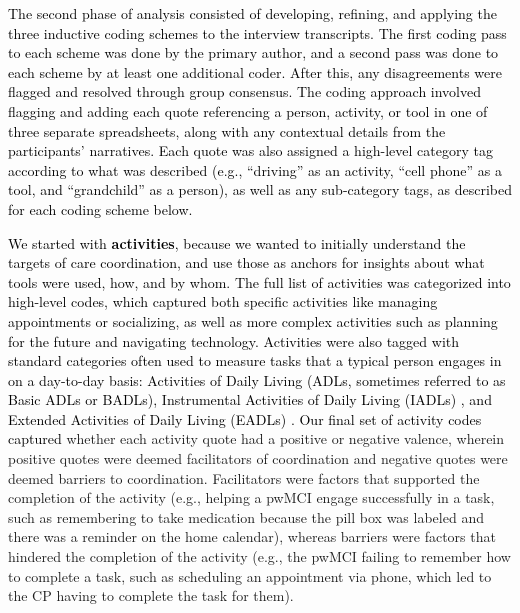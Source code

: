 \documentclass[acmsmall]{acmart}
\begin{document}
\textcolor{black}{The second phase of analysis consisted of developing, refining, and applying the three inductive coding schemes to the interview transcripts. The first coding pass to each scheme was done by the primary author, and a second pass was done to each scheme by at least one additional coder. After this, any disagreements were flagged and resolved through group consensus. The coding approach involved flagging and adding each quote referencing a person, activity, or tool in one of three separate spreadsheets, along with any contextual details from the participants’ narratives. Each quote was also assigned a high-level category tag according to what was described (e.g., “driving” as an activity, “cell phone” as a tool, and “grandchild” as a person), as well as any sub-category tags, as described for each coding scheme below.}

\textcolor{black}{We started with \textbf{activities}, because we wanted to initially understand the targets of care coordination, and use those as anchors for insights about what tools were used, how, and by whom. The full list of activities was categorized into high-level codes, which captured both specific activities like managing appointments or socializing, as well as more complex activities such as planning for the future and navigating technology. Activities were also tagged with  standard categories often used to measure tasks that a typical person engages in on a day-to-day basis: Activities of Daily Living (ADLs, sometimes referred to as Basic ADLs or BADLs), Instrumental Activities of Daily Living (IADLs) \cite{pashmdarfard2020assessment}, and Extended Activities of Daily Living (EADLs) \cite{kim2025evaluation}.  Our final set of activity codes captured} whether each activity quote had a positive or negative valence, wherein positive quotes were deemed facilitators of coordination and negative quotes were deemed barriers to coordination. Facilitators were factors that supported the completion of the activity (e.g., helping a pwMCI engage successfully in a task, such as remembering to take medication because the pill box was labeled and there was a reminder on the home calendar), whereas barriers were factors that hindered the completion of the activity (e.g., the pwMCI failing to remember how to complete a task, such as scheduling an appointment via phone, which led to the CP having to complete the task for them). 
\end{document}
